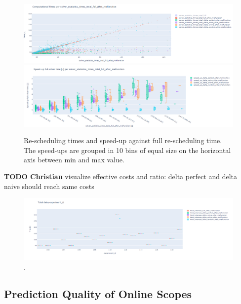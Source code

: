 \documentclass{article}
\begin{document}
\begin{figure}[hbtp]
	
    \includegraphics[width=\textwidth]{Figures/computation_times_per_times_total_full_after_malfunction.PNG}
        \includegraphics[width=\textwidth]{Figures/speedup.PNG}
	\caption{Re-scheduling times and speed-up against full re-scheduling time. The speed-ups are grouped in 10 bins of equal size on the horizontal axis between min and max value.}
	\label{fig:computationtimes}
\end{figure}

\begin{mdframed}
{\bf TODO Christian} visualize effective costs and ratio: delta perfect and delta naive should reach same costs 
\end{mdframed}

\begin{figure}[hbtp]
    \includegraphics[width=\textwidth]{Figures/total_delay.PNG}
	\caption{.}
	\label{fig:delay}
\end{figure}


\subsection{Prediction Quality of Online Scopes}
\end{document}
